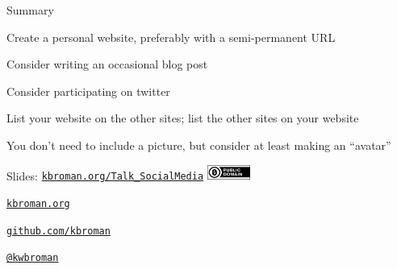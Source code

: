 \documentclass[12pt,t,aspectratio=169]{beamer}
\begin{document}
\begin{frame}[c]{Summary}

  \bbi
\item Create a personal website, preferably with a semi-permanent URL
\item Consider writing an occasional blog post
\item Consider participating on twitter
\item List your website on the other sites; list the other sites on
  your website
\item You don't need to include a picture, but consider at least
  making an ``avatar''
  \ei

\end{frame}



\begin{frame}[c]{}


\Large

Slides: \href{https://kbroman.org/Talk_SocialMedia}{\tt kbroman.org/Talk\_SocialMedia} \quad
\includegraphics[height=5mm]{Figs/cc-zero.png}


\vspace{7mm}

\href{https://kbroman.org}{\tt \lolit kbroman.org}

\vspace{7mm}

\href{https://github.com/kbroman}{\tt \lolit github.com/kbroman}

\vspace{7mm}

\href{https://twitter.com/kwbroman}{\tt \lolit @kwbroman}


\end{frame}
\end{document}
